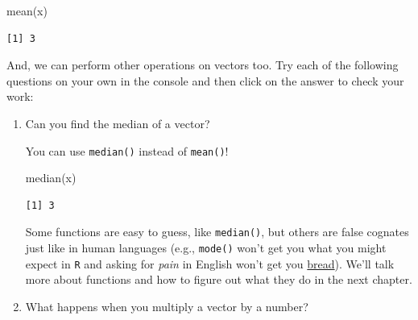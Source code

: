 \documentclass[
  letterpaper,
]{book}
\newenvironment{Shaded}{\begin{snugshade}}{\end{snugshade}}
\newcommand{\FunctionTok}[1]{\textcolor[rgb]{0.28,0.35,0.67}{#1}}
\newcommand{\NormalTok}[1]{\textcolor[rgb]{0.00,0.23,0.31}{#1}}
\begin{document}
\begin{Shaded}
\begin{Highlighting}[]
\FunctionTok{mean}\NormalTok{(x)}
\end{Highlighting}
\end{Shaded}

\begin{verbatim}
[1] 3
\end{verbatim}

And, we can perform other operations on vectors too. Try each of the
following questions on your own in the console and then click on the
answer to check your work:

\begin{enumerate}
\def\labelenumi{\arabic{enumi}.}
\item
  Can you find the median of a vector?

  \begin{tcolorbox}[enhanced jigsaw, colframe=quarto-callout-tip-color-frame, colback=white, title=\textcolor{quarto-callout-tip-color}{\faLightbulb}\hspace{0.5em}{Answer}, opacitybacktitle=0.6, coltitle=black, colbacktitle=quarto-callout-tip-color!10!white, arc=.35mm, leftrule=.75mm, bottomtitle=1mm, bottomrule=.15mm, breakable, opacityback=0, titlerule=0mm, rightrule=.15mm, left=2mm, toptitle=1mm, toprule=.15mm]

  You can use \texttt{median()} instead of \texttt{mean()}!

\begin{Shaded}
\begin{Highlighting}[]
\FunctionTok{median}\NormalTok{(x)}
\end{Highlighting}
\end{Shaded}

\begin{verbatim}
[1] 3
\end{verbatim}

  Some functions are easy to guess, like \texttt{median()}, but others
  are false cognates just like in human languages (e.g., \texttt{mode()}
  won't get you what you might expect in \texttt{R} and asking for
  \emph{pain} in English won't get you
  \href{https://fr.wikipedia.org/wiki/Pain}{bread}). We'll talk more
  about functions and how to figure out what they do in the next
  chapter.

  \end{tcolorbox}
\item
  What happens when you multiply a vector by a number?


\end{enumerate}
\end{document}

